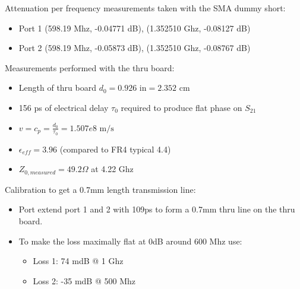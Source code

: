 Attenuation per frequency measurements taken with the SMA dummy short:
\begin{itemize}
    \item Port 1 (598.19 Mhz, -0.04771 dB), (1.352510 Ghz, -0.08127 dB)
    \item Port 2 (598.19 Mhz, -0.05873 dB), (1.352510 Ghz, -0.08767 dB)
\end{itemize}

Measurements performed with the thru board:
\begin{itemize}
    \item Length of thru board $d_0 = 0.926 \text{ in} = 2.352 \text{ cm}$
    \item 156 ps of electrical delay $\tau_0$ required to produce flat phase on $S_{21}$
    \item $v = c_p = \frac{d_0}{\tau_0} = 1.507e8 \text{ m/s}$
    \item $\epsilon_{eff} = 3.96$ (compared to FR4 typical 4.4)
    \item $Z_{0,measured} = 49.2 \Omega$ at 4.22 Ghz
\end{itemize}

Calibration to get a 0.7mm length transmission line:
\begin{itemize}
    \item Port extend port 1 and 2 with 109ps to form a 0.7mm thru line on the thru board.
    \item To make the loss maximally flat at 0dB around 600 Mhz use:
    \begin{itemize}
        \item Loss 1: 74 mdB @ 1 Ghz
        \item Loss 2: -35 mdB @ 500 Mhz
    \end{itemize}
\end{itemize}

